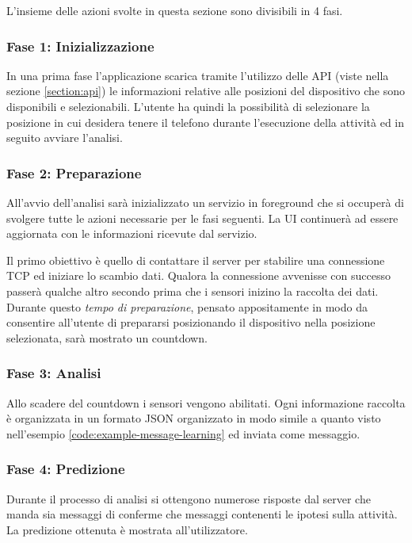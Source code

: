 L'insieme delle azioni svolte in questa sezione sono divisibili in 4 fasi.

\subsubsection{Fase 1: Inizializzazione}
In una prima fase l'applicazione scarica tramite l'utilizzo delle API (viste nella sezione \ref{section:api}) le informazioni relative
alle posizioni del dispositivo che sono disponibili e selezionabili.
L'utente ha quindi la possibilità di selezionare la posizione in cui desidera tenere il telefono durante l'esecuzione della attività ed 
in seguito avviare l'analisi.

\subsubsection{Fase 2: Preparazione}
All'avvio dell'analisi sarà inizializzato un servizio in foreground \cite{services} che si occuperà di svolgere tutte le azioni 
necessarie per le fasi seguenti. La UI continuerà ad essere aggiornata con le informazioni ricevute dal servizio.

Il primo obiettivo è quello di contattare il server per stabilire una connessione TCP ed iniziare lo scambio dati. 
Qualora la connessione avvenisse con successo passerà qualche altro secondo prima che i sensori inizino la raccolta dei dati.
Durante questo \textit{tempo di preparazione}, pensato appositamente in modo da consentire all'utente 
di prepararsi posizionando il dispositivo nella posizione selezionata, sarà mostrato un countdown.

\subsubsection{Fase 3: Analisi}
Allo scadere del countdown i sensori vengono abilitati. Ogni informazione raccolta è organizzata in un formato JSON organizzato in 
modo simile a quanto visto nell'esempio \ref{code:example-message-learning} ed inviata come messaggio.

\subsubsection{Fase 4: Predizione}
Durante il processo di analisi si ottengono numerose risposte dal server che manda sia messaggi di conferme che messaggi
contenenti le ipotesi sulla attività.
La predizione ottenuta è mostrata all'utilizzatore.

